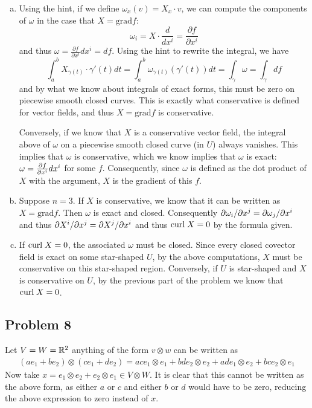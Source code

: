 \documentclass{../../mathnotes}
\begin{document}
\begin{enumerate}[(a)]
    \item Using the hint, if we define $\omega_x(v)=X_x\cdot v$, we can compute the components of $\omega$ in the case that $X=\text{grad} f$:
        \[\omega_i=X\cdot \frac{d}{dx^i}=\frac{\partial f}{\partial x^i}\]
        and thus $\omega=\frac{\partial f}{\partial x^i}dx^i=df$. Using the hint to rewrite the integral, we have
        \[\int_a^bX_{\gamma(t)}\cdot \gamma'(t)dt=\int_a^b\omega_{\gamma(t)}(\gamma'(t))dt=\int_\gamma\omega=\int_\gamma df\]
        and by what we know about integrals of exact forms, this must be zero on piecewise smooth closed curves. This is exactly
        what conservative is defined for vector fields, and thus $X=\text{grad} f$ is conservative.

        Conversely, if we know that $X$ is a conservative vector field, the integral above of $\omega$ on a piecewise smooth closed curve (in $U$) always vanishes.
        This implies that $\omega$ is conservative, which we know implies that $\omega$ is exact: $\omega=\frac{\partial f}{\partial x^i}dx^i$ for some $f$. Consequently, 
        since $\omega$ is defined as the dot product of $X$ with the argument, $X$ is the gradient of this $f$.
    \item Suppose $n=3$. If $X$ is conservative, we know that it can be written as $X=\text{grad} f$. Then $\omega$ is exact and closed. Consequently
        $\partial \omega_i/\partial x^j=\partial\omega_j/\partial x^i$ and thus $\partial X^i/\partial x^j=\partial X^j/\partial x^i$ and thus $\text{curl\;} X=0$ by the formula given.
    \item If $\text{curl\;} X=0$, the associated $\omega$ must be closed. Since every closed covector field is exact on some star-shaped $U$, by
        the above computations, $X$ must be conservative on this star-shaped region. Conversely, if $U$ is star-shaped and $X$ is conservative
        on $U$, by the previous part of the problem we know that $\text{curl\;} X=0$.
\end{enumerate}

\subsection*{Problem 8}

Let $V=W=\mathbb{R}^2$ anything of the form $v\otimes w$ can be written as
\begin{align*}
    (ae_1+be_2)\otimes (ce_1+de_2)=ace_1\otimes e_1+bde_2\otimes e_2+ade_1\otimes e_2+bce_2\otimes e_1
\end{align*}
Now take $x=e_1\otimes e_2+e_2\otimes e_1\in V\otimes W$. It is clear that this cannot be written as the above form,
as either $a$ or $c$ and either $b$ or $d$ would have to be zero, reducing the above expression to zero instead of $x$.
\end{document}
